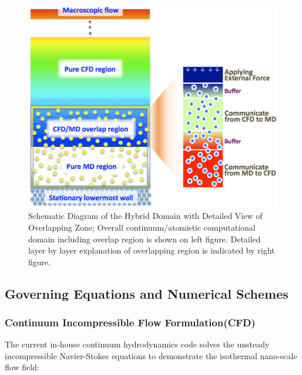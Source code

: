 \documentclass[preprint,12pt]{elsarticle}
\begin{document}
\begin{figure}
\centering
\includegraphics[width=0.8\linewidth]{Couette7.pdf}
\vskip-0.2cm
\caption{\small Schematic Diagram of the Hybrid Domain with Detailed View of Overlapping Zone; Overall continuum/atomistic computational domain including overlap region is shown on left figure. Detailed layer by layer explanation of overlapping region is indicated by right figure.}
\label{Fig:Couette}
\vspace{-1em}
\end{figure}



\subsection{Governing Equations and Numerical Schemes} 

\subsubsection{Continuum Incompressible Flow Formulation(CFD)}

The current in-house continuum hydrodynamics code solves the unsteady incompressible Navier-Stokes equations to demonstrate the isothermal nano-scale flow field:
\end{document}
